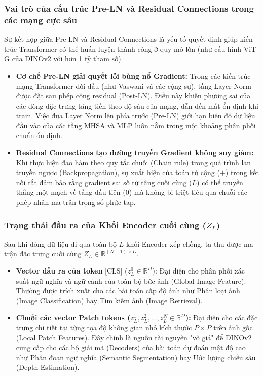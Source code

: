 \subsubsection{Vai trò của cấu trúc Pre-LN và Residual Connections trong các mạng cực sâu}
Sự kết hợp giữa Pre-LN và Residual Connections là yếu tố quyết định giúp kiến trúc Transformer có thể huấn luyện thành công ở quy mô lớn (như cấu hình ViT-G của DINOv2 với hơn 1 tỷ tham số).
\begin{itemize}
    \item \textbf{Cơ chế Pre-LN giải quyết lỗi bùng nổ Gradient:} Trong các kiến trúc mạng Transformer đời đầu (như Vaswani và các cộng sự), tầng Layer Norm được đặt sau phép cộng residual (Post-LN). Điều này khiến phương sai của các dòng đặc trưng tăng tiến theo độ sâu của mạng, dẫn đến mất ổn định khi train. Việc đưa Layer Norm lên phía trước (Pre-LN) giới hạn biên độ dữ liệu đầu vào của các tầng MHSA và MLP luôn nằm trong một khoảng phân phối chuẩn ổn định.
    \item \textbf{Residual Connections tạo đường truyền Gradient không suy giảm:} Khi thực hiện đạo hàm theo quy tắc chuỗi (Chain rule) trong quá trình lan truyền ngược (Backpropagation), sự xuất hiện của toán tử cộng ($+$) trong kết nối tắt đảm bảo rằng gradient sai số từ tầng cuối cùng ($L$) có thể truyền thẳng một mạch về tầng đầu tiên ($0$) mà không bị triệt tiêu qua chuỗi các phép nhân ma trận trọng số phức tạp.
\end{itemize}

\subsubsection{Trạng thái đầu ra của Khối Encoder cuối cùng ($Z_L$)}
Sau khi dòng dữ liệu đi qua toàn bộ $L$ khối Encoder xếp chồng, ta thu được ma trận đặc trưng cuối cùng $Z_L \in \mathbb{R}^{(N+1) \times D}$.
\begin{itemize}
    \item \textbf{Vector đầu ra của token} [CLS] ($z_L^0 \in \mathbb{R}^D$): Đại diện cho phân phối xác suất ngữ nghĩa và ngữ cảnh của toàn bộ bức ảnh (Global Image Feature). Thường được trích xuất cho các bài toán cấp độ ảnh như Phân loại ảnh (Image Classification) hay Tìm kiếm ảnh (Image Retrieval).
    \item \textbf{Chuỗi các vector Patch tokens ($z_L^1, z_L^2, \dots, z_L^N \in \mathbb{R}^D$):} Đại diện cho các đặc trưng chi tiết tại từng tọa độ không gian nhỏ kích thước $P \times P$ trên ảnh gốc (Local Patch Features). Đây chính là nguồn tài nguyên "vô giá" để DINOv2 cung cấp cho các bộ giải mã (Decoders) của bài toán dự đoán mật độ cao như Phân đoạn ngữ nghĩa (Semantic Segmentation) hay Ước lượng chiều sâu (Depth Estimation).
\end{itemize}



